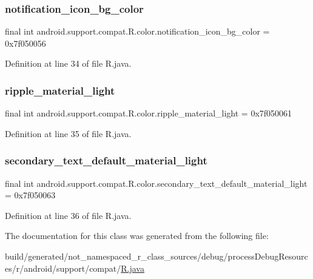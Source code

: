\subsubsection{\texorpdfstring{notification\_icon\_bg\_color}{notification\_icon\_bg\_color}}
{\footnotesize\ttfamily final int android.\+support.\+compat.\+R.\+color.\+notification\+\_\+icon\+\_\+bg\+\_\+color = 0x7f050056\hspace{0.3cm}{\ttfamily [static]}}



Definition at line 34 of file R.\+java.

\mbox{\label{classandroid_1_1support_1_1compat_1_1_r_1_1color_a9963bd6162040fda401e2439613f89c4}} 
\subsubsection{\texorpdfstring{ripple\_material\_light}{ripple\_material\_light}}
{\footnotesize\ttfamily final int android.\+support.\+compat.\+R.\+color.\+ripple\+\_\+material\+\_\+light = 0x7f050061\hspace{0.3cm}{\ttfamily [static]}}



Definition at line 35 of file R.\+java.

\mbox{\label{classandroid_1_1support_1_1compat_1_1_r_1_1color_ab34b571512153e84b130cbc074e1271a}} 
\subsubsection{\texorpdfstring{secondary\_text\_default\_material\_light}{secondary\_text\_default\_material\_light}}
{\footnotesize\ttfamily final int android.\+support.\+compat.\+R.\+color.\+secondary\+\_\+text\+\_\+default\+\_\+material\+\_\+light = 0x7f050063\hspace{0.3cm}{\ttfamily [static]}}



Definition at line 36 of file R.\+java.



The documentation for this class was generated from the following file\+:\begin{DoxyCompactItemize}
\item 
build/generated/not\+\_\+namespaced\+\_\+r\+\_\+class\+\_\+sources/debug/process\+Debug\+Resources/r/android/support/compat/\mbox{\hyperlink{android_2support_2compat_2_r_8java}{R.\+java}}\end{DoxyCompactItemize}
